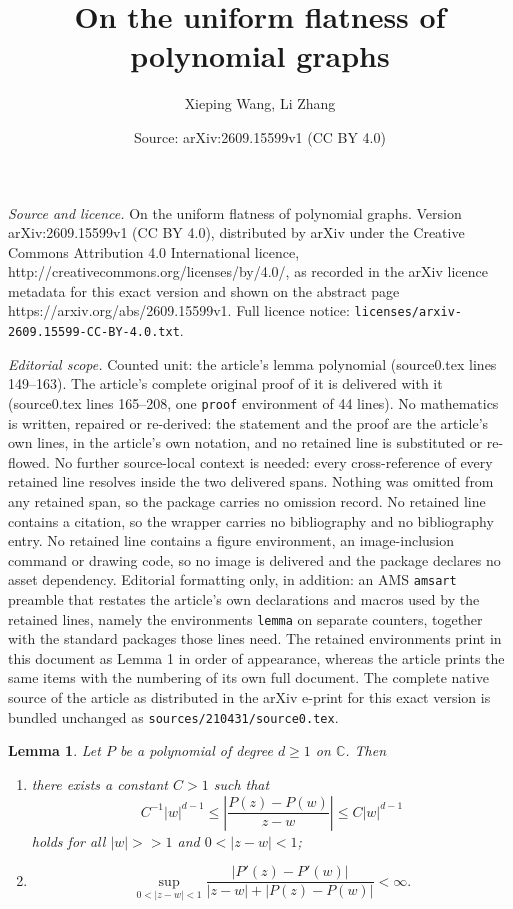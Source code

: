 \documentclass[10pt,a4paper]{amsart}
\title{On the uniform flatness of polynomial graphs}
\author{Xieping Wang, Li Zhang}
\date{Source: arXiv:2609.15599v1 (CC BY 4.0)}
\newtheorem{lemma}{Lemma}
\begin{document}
\maketitle

\noindent\emph{Source and licence.} On the uniform flatness of polynomial graphs. Version arXiv:2609.15599v1 (CC BY 4.0), distributed by arXiv under the Creative Commons Attribution 4.0 International licence, http://creativecommons.org/licenses/by/4.0/, as recorded in the arXiv licence metadata for this exact version and shown on the abstract page https://arxiv.org/abs/2609.15599v1. Full licence notice: \texttt{licenses/arxiv-2609.15599-CC-BY-4.0.txt}.\par\smallskip

\noindent\textit{Editorial scope.} Counted unit: the article's lemma polynomial (source0.tex lines 149--163). The article's complete original proof of it is delivered with it (source0.tex lines 165--208, one \texttt{proof} environment of 44 lines). No mathematics is written, repaired or re-derived: the statement and the proof are the article's own lines, in the article's own notation, and no retained line is substituted or re-flowed.  No further source-local context is needed: every cross-reference of every retained line resolves inside the two delivered spans.  Nothing was omitted from any retained span, so the package carries no omission record.  No retained line contains a citation, so the wrapper carries no bibliography and no bibliography entry.  No retained line contains a figure environment, an image-inclusion command or drawing code, so no image is delivered and the package declares no asset dependency.  Editorial formatting only, in addition: an AMS \texttt{amsart} preamble that restates the article's own declarations and macros used by the retained lines, namely the environments \texttt{lemma} on separate counters, together with the standard packages those lines need.  The retained environments print in this document as Lemma 1 in order of appearance, whereas the article prints the same items with the numbering of its own full document.  The complete native source of the article as distributed in the arXiv e-print for this exact version is bundled unchanged as \texttt{sources/210431/source0.tex}.
\begin{lemma}\label{Lem: polynomial}
  Let $P$ be a polynomial of degree $d\geq 1$ on $\mathbb C$. Then
  \begin{enumerate}[leftmargin=2.0pc, parsep=4pt]
   \item [{\rm(i)}] there exists a constant $C>1$ such that
         $$
         C^{-1}|w|^{d-1} \leq \left|\frac{P(z)-P(w)}{z-w}\right| \leq C|w|^{d-1}
         $$
      holds for all  $|w|>>1$ and $0<|z-w|<1$;

   \item [{\rm(ii)}]
         $$
         \sup\limits_{0<|z-w|<1}\frac{|P'(z)-P'(w)|}{|z-w|+|P(z)-P(w)|}<\infty.
         $$
  \end{enumerate}
\end{lemma}
\end{document}
